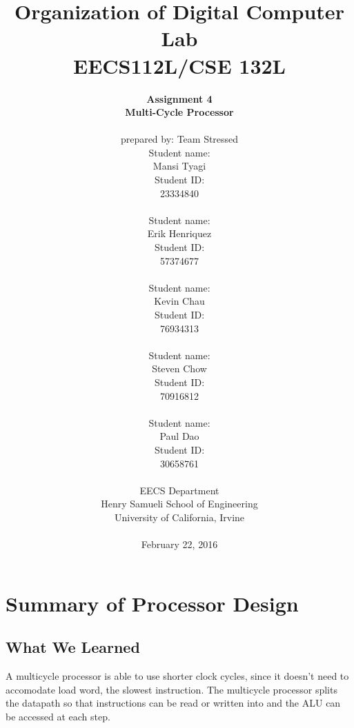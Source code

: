 \documentclass{article}
\begin{document}
\title{Organization of Digital Computer Lab \\ EECS112L/CSE 132L}
\author{\textbf{Assignment 4 }\\ \textbf{Multi-Cycle Processor} \\ \\
prepared by: Team Stressed \\ Student name: \\ Mansi Tyagi \\ Student ID: \\23334840\\ \\ Student name: \\ Erik Henriquez\\ Student ID: \\57374677\\ \\ Student name: \\ Kevin Chau \\ Student ID: \\76934313\\ \\ Student name: \\ Steven Chow\\Student ID: \\70916812\\ \\ Student name: \\ Paul Dao \\Student ID: \\30658761\\ \\
EECS Department\\ Henry Samueli School of Engineering \\ University of California, Irvine \\ \\
{February 22, 2016}} 


\date{}
\maketitle


\section{Summary of Processor Design}
\subsection{What We Learned}
A multicycle processor is able to use shorter clock cycles, since it doesn't need to accomodate load word, the slowest instruction. The multicycle processor splits the datapath so that instructions can be read or written into and the ALU can be accessed at each step.
\end{document}
